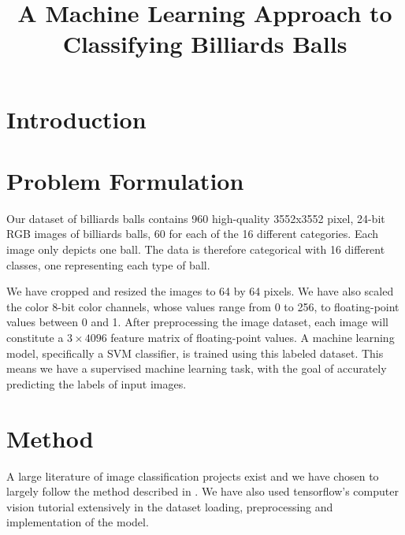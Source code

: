 \documentclass{article}
\begin{document}

\title{A Machine Learning Approach to Classifying Billiards Balls}
\maketitle

\section{Introduction}



\section{Problem Formulation}
\label{sec:problem_formulation}
Our dataset of billiards balls contains 960 high-quality 3552x3552 pixel, 24-bit RGB images of billiards balls, 60 for each of the 16 different categories. 
Each image only depicts one ball. The data is therefore categorical with 16 different classes, one representing each type of ball.


We have cropped and resized the images to 64 by 64 pixels. We have also scaled the color 8-bit color channels, whose values range from 0 to 256, 
to floating-point values between 0 and 1. After preprocessing the image dataset, each image will constitute a $3\times 4096$ feature matrix of floating-point values. 
A machine learning model, specifically a SVM classifier, is trained using this labeled dataset. This means we have a supervised machine learning task, with the goal of accurately 
predicting the labels of input images. 

\section{Method}
\label{sec:method}
A large literature of image classification projects exist and we have chosen to largely follow the method described in \cite{unknownMachineLearningApproach2023}.
We have also used tensorflow's computer vision tutorial extensively in the dataset loading, preprocessing and implementation of the model.\cite{ComputerVisionTensorFlow}
\end{document}

